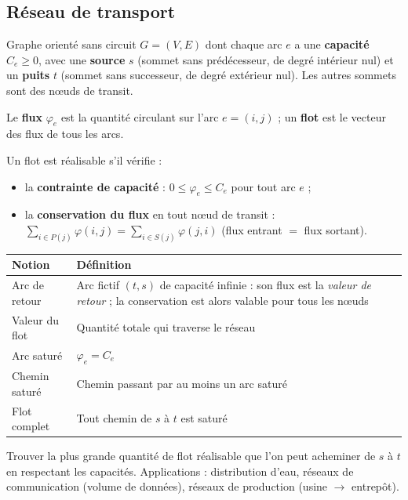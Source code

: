 \documentclass[11pt,a4paper]{article}
\begin{document}
\subsection{Réseau de transport}
\begin{definition}
Graphe orienté sans circuit $G=(V,E)$ dont chaque arc $e$ a une \textbf{capacité} $C_e\ge0$, avec une \textbf{source} $s$ (sommet sans prédécesseur, de degré intérieur nul) et un \textbf{puits} $t$ (sommet sans successeur, de degré extérieur nul). Les autres sommets sont des nœuds de transit.
\end{definition}

\begin{definition}
Le \textbf{flux} $\varphi_e$ est la quantité circulant sur l'arc $e=(i,j)$ ; un \textbf{flot} est le vecteur des flux de tous les arcs.
\end{definition}

\begin{retenir}
Un flot est réalisable s'il vérifie :
\begin{itemize}[nosep]
\item la \textbf{contrainte de capacité} : $0\le\varphi_e\le C_e$ pour tout arc $e$ ;
\item la \textbf{conservation du flux} en tout nœud de transit : $\displaystyle\sum_{i\in P(j)}\varphi(i,j)=\sum_{i\in S(j)}\varphi(j,i)$ (flux entrant $=$ flux sortant).
\end{itemize}
\end{retenir}

\begin{center}
\small
\begin{tabular}{@{}lp{12.5cm}@{}}
\toprule
\textbf{Notion} & \textbf{Définition}\\
\midrule
Arc de retour & Arc fictif $(t,s)$ de capacité infinie : son flux est la \emph{valeur de retour} ; la conservation est alors valable pour tous les nœuds\\
Valeur du flot & Quantité totale qui traverse le réseau\\
Arc saturé & $\varphi_e=C_e$\\
Chemin saturé & Chemin passant par au moins un arc saturé\\
Flot complet & Tout chemin de $s$ à $t$ est saturé\\
\bottomrule
\end{tabular}
\end{center}

\begin{definition}
Trouver la plus grande quantité de flot réalisable que l'on peut acheminer de $s$ à $t$ en respectant les capacités. Applications : distribution d'eau, réseaux de communication (volume de données), réseaux de production (usine $\to$ entrepôt).
\end{definition}
\end{document}
